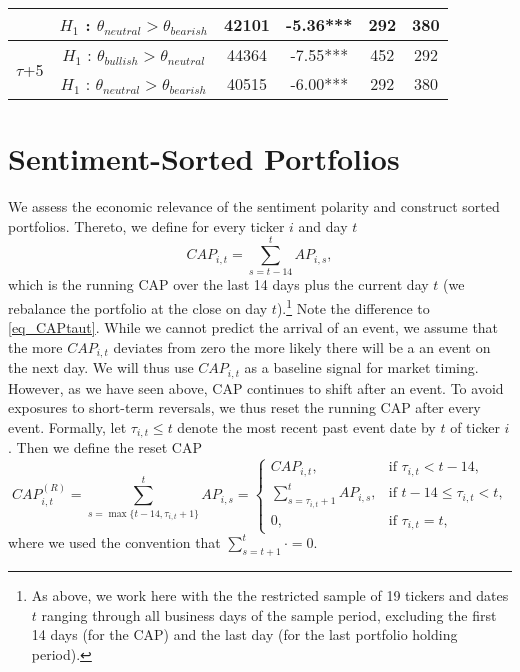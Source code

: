 \begin{table}
\begin{tabular}{|c|c|c|c|c|c|}
                                           & $H_1$ : $\theta_{neutral} > \theta_{bearish}$  & 42101 & -5.36*** & 292  & 380  \\ \hline
\multirow{2}{*}{$\tau$+5}                       & $H_1$ : $\theta_{bullish} > \theta_{neutral}$ & 44364 & -7.55*** & 452  & 292  \\
                                           & $H_1$ : $\theta_{neutral} > \theta_{bearish}$  & 40515 & -6.00*** & 292  & 380  \\ \hline
\end{tabular}
\label{utest_res}
\end{table}

\clearpage\section{Sentiment-Sorted Portfolios} \label{S:portfolios}

We assess the economic relevance of the sentiment polarity and construct sorted portfolios. Thereto, we define for every ticker $i$ and day $t$ 
\begin{equation}
     CAP_{i,t}=\sum_{s=t-14}^t AP_{i,s},
\end{equation}
which is the running CAP over the last 14 days plus the current day $t$ (we rebalance the portfolio at the close on day $t$).\footnote{As above, we work here with the the restricted sample of 19 tickers and dates $t$ ranging through all business days of the sample period, excluding the first 14 days (for the CAP) and the last day (for the last portfolio holding period).} Note the difference to \eqref{eq_CAPtaut}. While we cannot predict the arrival of an event, we assume that the more $CAP_{i,t}$ deviates from zero the more likely there will be a an event on the next day. We will thus use $CAP_{i,t}$ as a baseline signal for market timing. However, as we have seen above, CAP continues to shift after an event. To avoid exposures to short-term reversals, we thus reset the running CAP after every event. Formally, let $\tau_{i,t}\le t$ denote the most recent past event date by $t$ of ticker $i$. Then we define the reset CAP
\begin{equation}
    CAP_{i,t}^{(R)} = \sum_{s=\max\{t-14,\tau_{i,t}+1\}}^t AP_{i,s} = \begin{cases} CAP_{i,t},&\text{if $\tau_{i,t}<t-14$,} \\ \sum_{s= \tau_{i,t}+1}^t AP_{i,s},&\text{if $t-14\le \tau_{i,t}<t$,}\\
0,&\text{if $\tau_{i,t}=t$,}\end{cases}
\end{equation}
where we used the convention that $\sum_{s=t+1}^t \cdot =0$.

